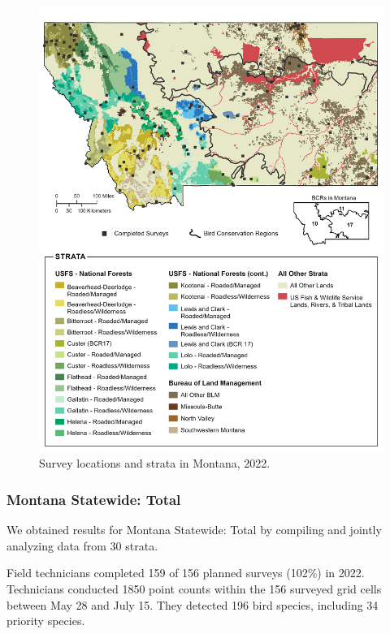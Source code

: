 \documentclass[
  letterpaper,
  DIV=11,
  numbers=noendperiod,
  oneside]{scrreprt}
\begin{document}
\begin{figure}

{\centering \includegraphics{./MT_Report_2022_NoLogo.png}

}

\caption{\label{fig-mt}Survey locations and strata in Montana, 2022.}

\end{figure}

\hypertarget{montana-statewide-total}{%
\subsubsection{Montana Statewide: Total}\label{montana-statewide-total}}

We obtained results for Montana Statewide: Total by compiling and
jointly analyzing data from 30 strata.

Field technicians completed 159 of 156 planned surveys (102\%) in 2022.
Technicians conducted 1850 point counts within the 156 surveyed grid
cells between May 28 and July 15. They detected 196 bird species,
including 34 priority species.
\end{document}
